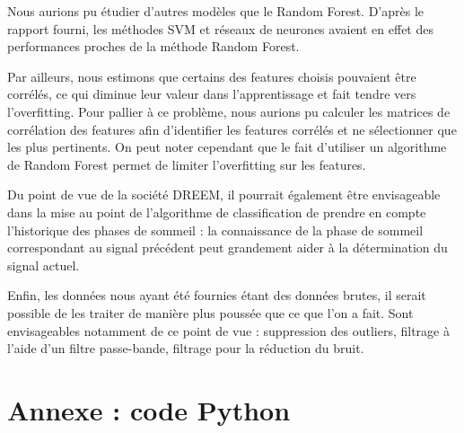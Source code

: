 \documentclass{article}
\begin{document}
\vspace{\baselineskip}

Nous aurions pu étudier d'autres modèles que le Random Forest. D'après le rapport fourni, les méthodes SVM et réseaux de neurones avaient en effet des performances proches de la méthode Random Forest.

\vspace{\baselineskip}

Par ailleurs, nous estimons que certains des features choisis pouvaient être corrélés, ce qui diminue leur valeur dans l'apprentissage et fait tendre vers l'overfitting. Pour pallier à ce problème, nous aurions pu calculer les matrices de corrélation des features afin d'identifier les features corrélés et ne sélectionner que les plus pertinents. On peut noter cependant que le fait d'utiliser un algorithme de Random Forest permet de limiter l'overfitting sur les features.

\vspace{\baselineskip}

Du point de vue de la société DREEM, il pourrait également être envisageable dans la mise au point de l'algorithme de classification de prendre en compte l'historique des phases de sommeil : la connaissance de la phase de sommeil correspondant au signal précédent peut grandement aider à la détermination du signal actuel.

\vspace{\baselineskip}

Enfin, les données nous ayant été fournies étant des données brutes, il serait possible de les traiter de manière plus poussée que ce que l'on a fait. Sont envisageables notamment de ce point de vue : suppression des outliers, filtrage à l'aide d'un filtre passe-bande, filtrage pour la réduction du bruit.


\newpage
\section{\hspace{0.3cm} Annexe : code Python}
\end{document}
